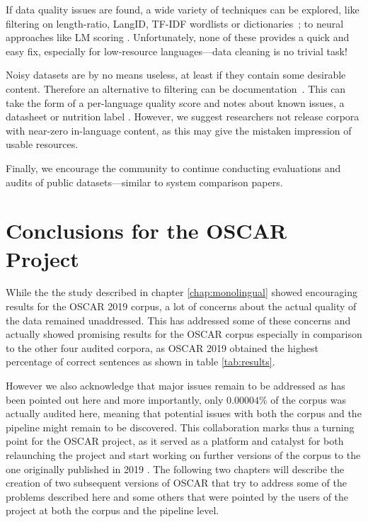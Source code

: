 If data quality issues are found, a wide variety of techniques can be explored, like filtering on length-ratio, LangID, TF-IDF wordlists \cite{caswell-etal-2020-language} or dictionaries~\citep{kamholz-etal-2014-panlex}; to neural approaches like LM scoring \cite{axelrod-etal-2011-domain,moore-lewis-2010-intelligent,wang-etal-2018-denoising}. Unfortunately, none of these provides a quick and easy fix, especially for low-resource languages---data cleaning is no trivial task!

Noisy datasets are by no means useless, at least if they contain some desirable content. Therefore an alternative to filtering can be documentation~\citep{bender-etal-2021-on}. This can take the form of a per-language quality score and notes about known issues,
a datasheet \citep{gebru-etal-2018-datasheets} or nutrition label \citep{holland-etal-2018-the}. However, we suggest researchers not release corpora with near-zero in-language content, as this may give the mistaken impression of usable resources.

Finally, we encourage the community to continue conducting evaluations and audits of public datasets---similar to system comparison papers.

\section{Conclusions for the OSCAR Project}

While the the study described in chapter \ref{chap:monolingual} showed encouraging results for the OSCAR 2019 corpus, a lot of concerns about the actual quality of the data remained unaddressed. This has addressed some of these concerns and actually showed promising results for the OSCAR corpus especially in comparison to the other four audited corpora, as OSCAR 2019 obtained the highest percentage of correct sentences as shown in table \ref{tab:results}.

However we also acknowledge that major issues remain to be addressed as has been pointed out here and more importantly, only $0.00004\%$ of the corpus was actually audited here, meaning that potential issues with both the corpus and the pipeline might remain to be discovered. This collaboration marks thus a turning point for the OSCAR project, as it served as a platform and catalyst for both relaunching the project and start working on further versions of the corpus to the one originally published in 2019 \citep{ortiz-suarez-etal-2019-asynchronous}. The following two chapters will describe the creation of two subsequent versions of OSCAR that try to address some of the problems described here and some others that were pointed by the users of the project at both the corpus and the pipeline level.

